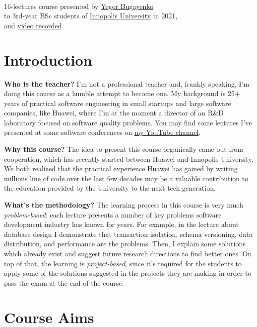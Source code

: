 \documentclass[nobrand,anonymous,nodate,nosecurity]{huawei}
\begin{document}
{\\
16-lectures course presented by \href{https://www.yegor256.com}{Yegor Bugayenko}\\
to 3rd-year BSc students of \href{https://innopolis.university/en/}{Innopolis University} in 2021,\\
and \href{https://www.youtube.com/playlist?list=PLaIsQH4uc08woJKRAA7mmjs9fU0jeKjjM}{video recorded}}

\section*{Introduction}

\textbf{Who is the teacher?}
I'm not a professional teacher and, frankly speaking, I'm doing this course
as a humble attempt to become one. My background is 25+ years of
practical software engineering in small startups and large software companies,
like Huawei, where I'm at the moment a director of an R\&D laboratory focused
on software quality problems. You may find some lectures I've presented
at some software conferences on \href{https://www.youtube.com/channel/UCr9qCdqXLm2SU0BIs6d_68Q}{my YouTube channel}.

\textbf{Why this course?}
The idea to present this course organically
came out from cooperation, which has recently started between
Huawei and Innopolis University. We both realized that the practical experience
Huawei has gained by writing millions line of code over the last few decades
may be a valuable contribution to the education provided by the University
to the next tech generation.

\textbf{What's the methodology?}
The learning process in this course is very much \emph{problem-based}:
each lecture presents a number of key problems software development industry
has known for years. For example, in the lecture about database design I
demonstrate that transaction isolation, schema versioning, data distribution, and
performance are the problems. Then, I explain some solutions which already
exist and suggest future research directions to find better ones. On top
of that, the learning is \emph{project-based}, since it's required for the
students to apply some of the solutions suggested in the projects they are
making in order to pass the exam at the end of the course.

\newpage
\section*{Course Aims}
\end{document}
